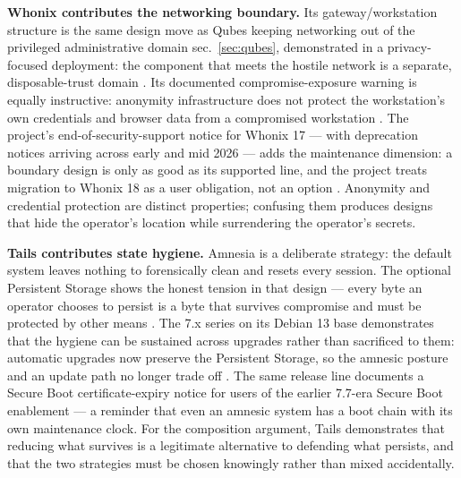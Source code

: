 \documentclass[
  english,
  9pt,
]{extarticle}
\begin{document}
\textbf{Whonix contributes the networking boundary.} Its
gateway/workstation structure is the same design move as Qubes keeping
networking out of the privileged administrative domain
sec.~\ref{sec:qubes}, demonstrated in a privacy-focused deployment: the
component that meets the hostile network is a separate, disposable-trust
domain \citep{whonix_technical_design}. Its documented
compromise-exposure warning is equally instructive: anonymity
infrastructure does not protect the workstation's own credentials and
browser data from a compromised workstation
\citep{whonix_workstation_security}. The project's
end-of-security-support notice for Whonix 17 --- with deprecation
notices arriving across early and mid 2026 --- adds the maintenance
dimension: a boundary design is only as good as its supported line, and
the project treats migration to Whonix 18 as a user obligation, not an
option \citep{whonix_18_support}. Anonymity and credential protection
are distinct properties; confusing them produces designs that hide the
operator's location while surrendering the operator's secrets.

\textbf{Tails contributes state hygiene.} Amnesia is a deliberate
 strategy: the default system leaves
nothing to forensically clean and resets every session. The optional
Persistent Storage shows the honest tension in that design --- every
byte an operator chooses to persist is a byte that survives compromise
and must be protected by other means \citep{tails_persistent_storage}.
The 7.x series on its Debian 13 base demonstrates that the hygiene can
be sustained across upgrades rather than sacrificed to them: automatic
upgrades now preserve the Persistent Storage, so the amnesic posture and
an update path no longer trade off \citep{tails_7_12}. The same release
line documents a Secure Boot certificate-expiry notice for users of the
earlier 7.7-era Secure Boot enablement --- a reminder that even an
amnesic system has a boot chain with its own maintenance clock. For the
composition argument, Tails demonstrates that reducing what survives is
a legitimate alternative to defending what persists, and that the two
strategies must be chosen knowingly rather than mixed accidentally.
\end{document}
